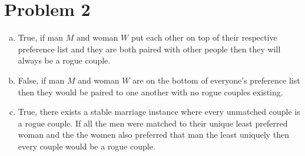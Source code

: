 \documentclass[11pt,letterpaper]{article}
\begin{document}
\section*{Problem 2}
\begin{enumerate}[(a)]
\item
True, if man $M$ and woman $W$ put each other on top of their respective preference list and they are both paired with other people then they will always be a rogue couple.\\
\item
False, if man $M$ and woman $W$ are on the bottom of everyone's preference list then they would be paired to one another with no rogue couples existing.\\
\item
True, there exists a stable marriage instance where every unmatched couple is a rogue couple. If all the men were matched to their unique least preferred woman and the the women also preferred that man the least uniquely then every couple would be a rogue couple.\\
\end{enumerate} 
\clearpage
\end{document}
